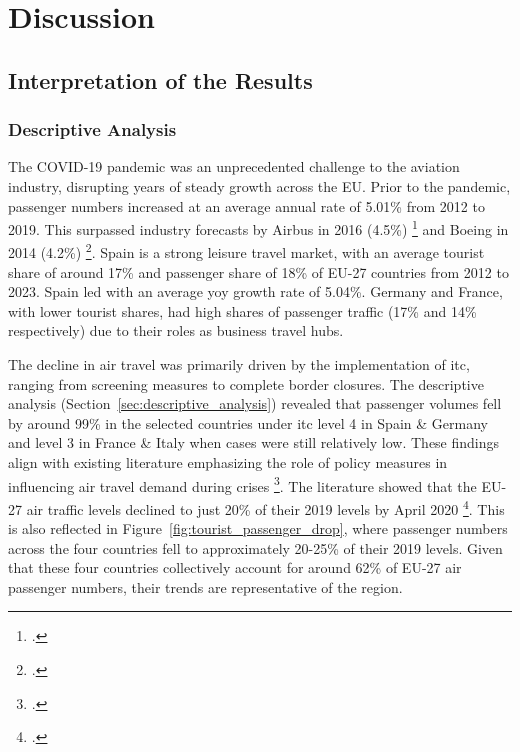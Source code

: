 \documentclass[12pt,onehalfspacing,headsepline,oneside,openright,a4paper, fleqn]{report}
\begin{document}
\newpage







\chapter{Discussion}

\section{Interpretation of the Results}

\subsection*{Descriptive Analysis}

The COVID-19 pandemic was an unprecedented challenge to the aviation industry, disrupting years of steady growth across the EU. Prior to the pandemic, passenger numbers increased at an average annual rate of 5.01\% from 2012 to 2019. This surpassed industry forecasts by Airbus in 2016 (4.5\%) \footcite[10]{airbus2016} and Boeing in 2014 (4.2\%) \footcite[3]{boeing2014}. Spain is a strong leisure travel market, with an average tourist share of around 17\% and passenger share of 18\% of EU-27 countries from 2012 to 2023. Spain led with an average \gls{yoy} growth rate of 5.04\%. Germany and France, with lower tourist shares, had high shares of passenger traffic (17\% and 14\% respectively) due to their roles as business travel hubs.

The decline in air travel was primarily driven by the implementation of \gls{itc}, ranging from screening measures to complete border closures. The descriptive analysis (Section~\ref{sec:descriptive_analysis}) revealed that passenger volumes fell by around 99\% in the selected countries under \gls{itc} level 4 in Spain \& Germany and level 3 in France \& Italy when cases were still relatively low. These findings align with existing literature emphasizing the role of policy measures in influencing air travel demand during crises \footcite[3]{IACUS2020}. The literature showed that the EU-27 air traffic levels declined to just 20\% of their 2019 levels by April 2020 \footcite[2]{dube2021b}. This is also reflected in Figure~\ref{fig:tourist_passenger_drop}, where passenger numbers across the four countries fell to approximately 20-25\% of their 2019 levels. Given that these four countries collectively account for around 62\% of EU-27 air passenger numbers, their trends are representative of the region.
\end{document}
